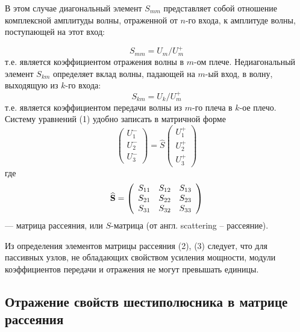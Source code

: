 В этом случае диагональный элемент $S_{mm}$ представляет собой отношение комплексной амплитуды волны, отраженной от $n$-го входа, к амплитуде волны, поступающей на этот вход:

\begin{equation}
	S _ { m m } = U _ { m } / U _ { m } ^ { + }
\end{equation}
т.е. является коэффициентом отражения волны в $m$-ом плече. Недиагональный элемент $S_{km}$ определяет вклад волны, падающей на $m$-ый вход, в волну, выходящую из $k$-го входа:
\begin{equation}
	S _ { k m } = U _ { k } / U _ { m } ^ { + }
\end{equation}
т.е. является коэффициентом передачи волны из $m$-го плеча в $k$-ое плечо. Систему уравнений (1) удобно записать в матричной форме
\begin{equation}
	\left( \begin{array} { c } { U _ { 1 } ^ { - } } \\ { U _ { 2 } ^ { - } } \\ { U _ { 3 } ^ { - } } \end{array} \right) = \hat { S } \left( \begin{array} { l } { U _ { 1 } ^ { + } } \\ { U _ { 2 } ^ { + } } \\ { U _ { 3 } ^ { + } } \end{array} \right)
\end{equation}
где
\begin{equation*}
	\hat { \mathbf { S } } = \left( \begin{array} { c c c } { S _ { 11 } } & { S _ { 12 } } & { S _ { 13 } } \\ { S _ { 21 } } & { S _ { 22 } } & { S _ { 23 } } \\ { S _ { 31 } } & { S _ { 32 } } & { S _ { 33 } } \end{array} \right)
\end{equation*}
--- матрица рассеяния, или $S$-матрица (от англ. scattering -- рассеяние).

Из определения элементов матрицы рассеяния (2), (3) следует, что для пассивных узлов, не обладающих свойством усиления мощности, модули коэффициентов передачи и отражения не могут превышать единицы.
\subsection{Отражение свойств шестиполюсника в матрице рассеяния}


